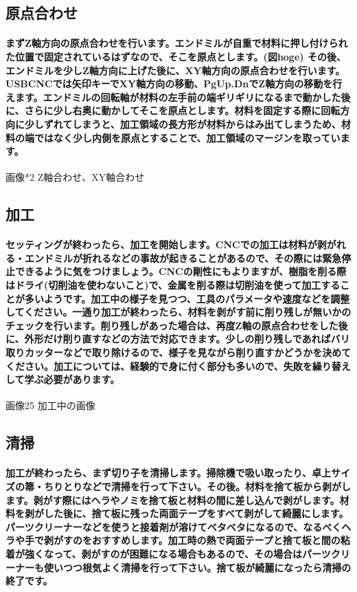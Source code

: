 \documentclass[b5paper, 9pt, twocolumn, titlepage,openany]{jsbook}%
\begin{document}
\subsection{原点合わせ}
\paragraph{まずZ軸方向の原点合わせを行います。エンドミルが自重で材料に押し付けられた位置で固定されているはずなので、そこを原点とします。(図hoge) その後、エンドミルを少しZ軸方向に上げた後に、XY軸方向の原点合わせを行います。USBCNCでは矢印キーでXY軸方向の移動、PgUp.DnでZ軸方向の移動を行えます。エンドミルの回転軸が材料の左手前の端ギリギリになるまで動かした後に、さらに少し右奥に動かしてそこを原点とします。材料を固定する際に回転方向に少しずれてしまうと、加工領域の長方形が材料からはみ出てしまうため、材料の端ではなく少し内側を原点とすることで、加工領域のマージンを取っています。}

画像*2 Z軸合わせ、XY軸合わせ

\subsection{加工}
\paragraph{セッティングが終わったら、加工を開始します。CNCでの加工は材料が剥がれる・エンドミルが折れるなどの事故が起きることがあるので、その際には緊急停止できるように気をつけましょう。CNCの剛性にもよりますが、樹脂を削る際はドライ(切削油を使わないこと)で、金属を削る際は切削油を使って加工することが多いようです。加工中の様子を見つつ、工具のパラメータや速度などを調整してください。一通り加工が終わったら、材料を剥がす前に削り残しが無いかのチェックを行います。削り残しがあった場合は、再度Z軸の原点合わせをした後に、外形だけ削り直すなどの方法で対応できます。少しの削り残しであればバリ取りカッターなどで取り除けるので、様子を見ながら削り直すかどうかを決めてください。加工については、経験的で身に付く部分も多いので、失敗を繰り替えして学ぶ必要があります。}

画像25 加工中の画像

\subsection{清掃}
\paragraph{加工が終わったら、まず切り子を清掃します。掃除機で吸い取ったり、卓上サイズの箒・ちりとりなどで清掃を行って下さい。その後。材料を捨て板から剥がします。剥がす際にはヘラやノミを捨て板と材料の間に差し込んで剥がします。材料を剥がした後に、捨て板に残った両面テープをすべて剥がして綺麗にします。パーツクリーナーなどを使うと接着剤が溶けてベタベタになるので、なるべくヘラや手で剥がすのをおすすめします。加工時の熱で両面テープと捨て板と間の粘着が強くなって、剥がすのが困難になる場合もあるので、その場合はパーツクリーナーも使いつつ根気よく清掃を行って下さい。捨て板が綺麗になったら清掃の終了です。}
\end{document}
